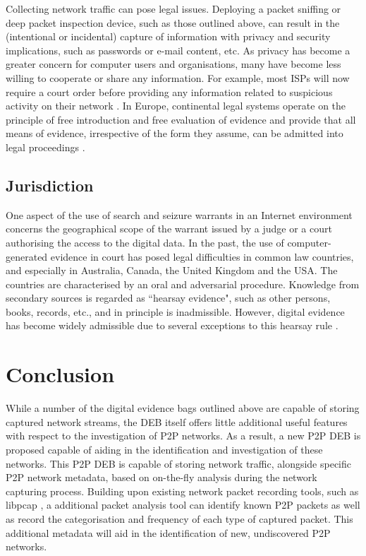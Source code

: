 \documentclass[runningheads,a4paper]{llncs}
\begin{document}
Collecting network traffic can pose legal issues. Deploying a packet sniffing or deep packet inspection device, such as those outlined above, can result in the (intentional or incidental) capture of information with privacy and security implications, such as passwords or e-mail content, etc. As privacy has become a greater concern for computer users and organisations, many have become less willing to cooperate or share any information. For example, most ISPs will now require a court order before providing any information related to suspicious activity on their network \cite{Nist:2012:NSP:2331550}. In Europe, continental legal systems operate on the principle of free introduction and free evaluation of evidence and provide that all means of evidence, irrespective of the form they assume, can be admitted into legal proceedings \cite{karyda2007internet}.


\subsection{Jurisdiction}
\label{ch2:jurisdiction}
One aspect of the use of search and seizure warrants in an Internet environment concerns the geographical scope of the warrant issued by a judge or a court authorising the access to the digital data. In the past, the use of computer-generated evidence in court has posed legal difficulties in common law countries, and especially in Australia, Canada, the United Kingdom and the USA. The countries are characterised by an oral and adversarial procedure. Knowledge from secondary sources is regarded as ``hearsay evidence", such as other persons, books, records, etc., and in principle is inadmissible. However, digital evidence has become widely admissible due to several exceptions to this hearsay rule \cite{karyda2007internet}.

\section{Conclusion}

While a number of the digital evidence bags outlined above are capable of storing captured network streams, the DEB itself offers little additional useful features with respect to the investigation of P2P networks. As a result, a new P2P DEB is proposed capable of aiding in the identification and investigation of these networks. This P2P DEB is capable of storing network traffic, alongside specific P2P network metadata, based on on-the-fly analysis during the network capturing process. Building upon existing network packet recording tools, such as libpcap \cite{libpcap}, a additional packet analysis tool can identify known P2P packets as well as record the categorisation and frequency of each type of captured packet. This additional metadata will aid in the identification of new, undiscovered P2P networks.





\end{document}

